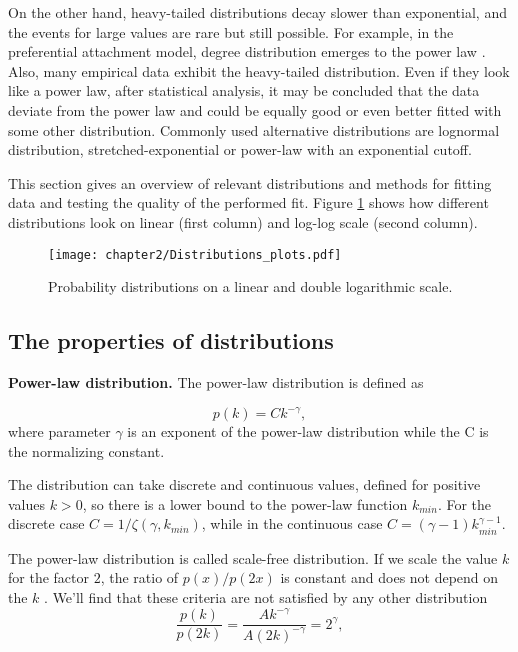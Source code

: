 On the other hand, heavy-tailed distributions decay slower than exponential, and the events for large values are rare but still possible. For example, in the preferential attachment model, degree distribution emerges to the power law \cite{barabasi2016network}. Also, many empirical data exhibit the heavy-tailed distribution. Even if they look like a power law, after statistical analysis, it may be concluded that the data deviate from the power law and could be equally good or even better fitted with some other distribution. Commonly used alternative distributions are lognormal distribution, stretched-exponential or power-law with an exponential cutoff. 

This section gives an overview of relevant distributions and methods for fitting data and testing the quality of the performed fit. Figure \ref{fig:distributions} shows how different distributions look on linear (first column) and log-log scale (second column).

\begin{figure}[!h]
	\centering
	\texttt{[image: chapter2/Distributions\_plots.pdf]}
	\caption{Probability distributions on a linear and double logarithmic scale.}
	\label{fig:distributions}
\end{figure}

\subsection{The properties of distributions}

\textbf{Power-law distribution.} The power-law distribution \cite{mitzenmacher2004brief, newman2005power} is defined as 

\begin{equation}
p(k) = C k^{-\gamma},
\end{equation}
where parameter $\gamma$ is an exponent of the power-law distribution while the C is the normalizing constant. 

The distribution can take discrete and continuous values, defined for positive values $k>0$, so there is a lower bound to the power-law function $k_{min}$. For the discrete case $C=1/\zeta(\gamma, k_{min})$, while in the continuous case $C=(\gamma-1)k_{min}^{\gamma-1}$. 

The power-law distribution is called scale-free distribution. If we scale the value $k$ for the factor $2$, the ratio of $p(x)/p(2x)$ is constant and does not depend on the $k$ \cite{caldarelli2007scalefree}. We'll find that these criteria are not satisfied by any other distribution
\begin{equation}
\frac{p(k)}{p(2k)} = \frac{Ak^{-\gamma}}{A(2k)^{-\gamma}} = 2^{\gamma},
\end{equation}

